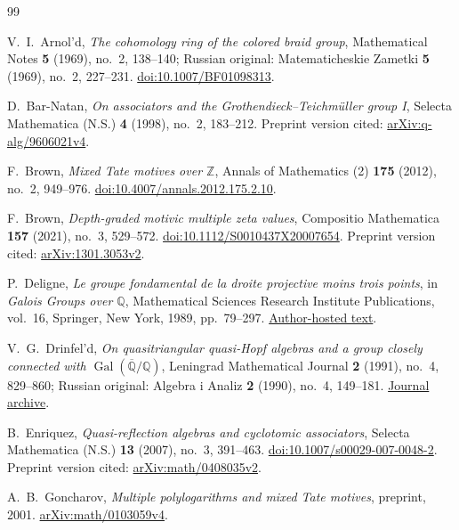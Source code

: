 \documentclass[11pt]{article}
\theoremstyle{definition}
\theoremstyle{remark}
\numberwithin{equation}{section}
\begin{document}
\begin{thebibliography}{99}

V.~I.~Arnol'd,
\emph{The cohomology ring of the colored braid group},
Mathematical Notes \textbf{5} (1969), no.~2, 138--140;
Russian original: Matematicheskie Zametki \textbf{5} (1969), no.~2, 227--231.
\href{https://doi.org/10.1007/BF01098313}{doi:10.1007/BF01098313}.

D.~Bar-Natan,
\emph{On associators and the Grothendieck--Teichm\"uller group I},
Selecta Mathematica (N.S.) \textbf{4} (1998), no.~2, 183--212.
Preprint version cited:
\href{https://arxiv.org/abs/q-alg/9606021v4}{arXiv:q-alg/9606021v4}.

F.~Brown,
\emph{Mixed Tate motives over \(\mathbb{Z}\)},
Annals of Mathematics (2) \textbf{175} (2012), no.~2, 949--976.
\href{https://doi.org/10.4007/annals.2012.175.2.10}{doi:10.4007/annals.2012.175.2.10}.

F.~Brown,
\emph{Depth-graded motivic multiple zeta values},
Compositio Mathematica \textbf{157} (2021), no.~3, 529--572.
\href{https://doi.org/10.1112/S0010437X20007654}{doi:10.1112/S0010437X20007654}.
Preprint version cited:
\href{https://arxiv.org/abs/1301.3053v2}{arXiv:1301.3053v2}.

P.~Deligne,
\emph{Le groupe fondamental de la droite projective moins trois points},
in \emph{Galois Groups over \(\mathbb Q\)},
Mathematical Sciences Research Institute Publications, vol.~16,
Springer, New York, 1989, pp.~79--297.
\href{https://publications.ias.edu/sites/default/files/61_LeGroupeFondamentalDroite.pdf}{Author-hosted text}.

V.~G.~Drinfel'd,
\emph{On quasitriangular quasi-Hopf algebras and a group closely
connected with \(\operatorname{Gal}(\overline{\mathbb{Q}}/\mathbb{Q})\)},
Leningrad Mathematical Journal \textbf{2} (1991), no.~4, 829--860;
Russian original: Algebra i Analiz \textbf{2} (1990), no.~4, 149--181.
\href{https://www.mathnet.ru/eng/aa199}{Journal archive}.

B.~Enriquez,
\emph{Quasi-reflection algebras and cyclotomic associators},
Selecta Mathematica (N.S.) \textbf{13} (2007), no.~3, 391--463.
\href{https://doi.org/10.1007/s00029-007-0048-2}{doi:10.1007/s00029-007-0048-2}.
Preprint version cited:
\href{https://arxiv.org/abs/math/0408035v2}{arXiv:math/0408035v2}.

A.~B.~Goncharov,
\emph{Multiple polylogarithms and mixed Tate motives},
preprint, 2001.
\newline
\href{https://arxiv.org/abs/math/0103059v4}{arXiv:math/0103059v4}.


\end{thebibliography}
\end{document}

